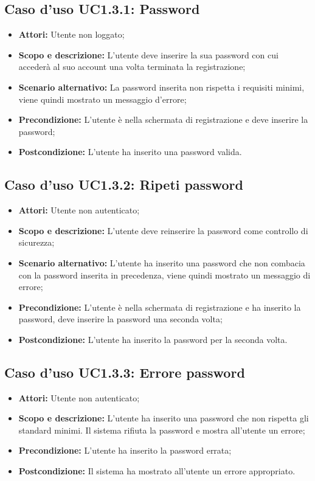 \documentclass[12pt,a4paper,titlepage]{article}
\begin{document}
	\subsection{Caso d'uso UC1.3.1: Password}
	\label{UC1.3.1}
	\begin{itemize}
		\item \textbf{Attori: }Utente non loggato;
		\item \textbf{Scopo e descrizione: }L'utente deve inserire la sua password con cui accederà al suo account una volta terminata la registrazione;
		\item \textbf{Scenario alternativo: }La password inserita non rispetta i requisiti minimi, viene quindi mostrato un messaggio d'errore;
		\item \textbf{Precondizione: }L'utente è nella schermata di registrazione e deve inserire la password;
		\item \textbf{Postcondizione: }L'utente ha inserito una password valida.
	\end{itemize}
	\subsection{Caso d'uso UC1.3.2: Ripeti password}
	\label{UC1.3.2}
	\begin{itemize}
		\item \textbf{Attori: }Utente non autenticato;
		\item \textbf{Scopo e descrizione: }L'utente deve reinserire la password come controllo di sicurezza;
		\item \textbf{Scenario alternativo: }L'utente ha inserito una password che non combacia con la password inserita in precedenza, viene quindi mostrato un messaggio di errore;
		\item \textbf{Precondizione: }L'utente è nella schermata di registrazione e ha inserito la password, deve inserire la password una seconda volta;
		\item \textbf{Postcondizione: }L'utente ha inserito la password per la seconda volta.
	\end{itemize}
	\subsection{Caso d'uso UC1.3.3: Errore password}
	\label{UC1.3.3}
	\begin{itemize}
		\item \textbf{Attori: }Utente non autenticato;
		\item \textbf{Scopo e descrizione: }L'utente ha inserito una password che non rispetta gli standard minimi. Il sistema rifiuta la password e mostra all'utente un errore;
		\item \textbf{Precondizione: }L'utente ha inserito la password errata;
		\item \textbf{Postcondizione: }Il sistema ha mostrato all'utente un errore appropriato.
	\end{itemize}
\end{document}
